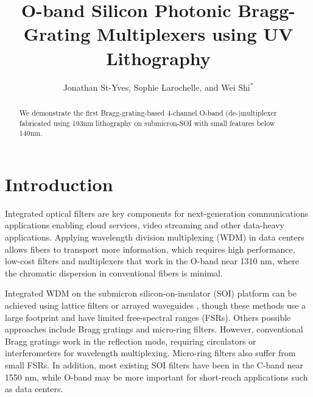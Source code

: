 \documentclass[letterpaper,10pt]{article}
\begin{document}
	
	\title{O-band Silicon Photonic Bragg-Grating Multiplexers using UV Lithography}
	
	\author{Jonathan St-Yves, Sophie Larochelle, and Wei Shi$^*$}
	\address{Centre d'optique, photonique et laser (COPL) and Département de génie électrique, Université Laval, 2375 rue de la Terrasse, Québec (Québec), Canada, G1V 0A6}
	
	\begin{abstract}
		We demonstrate the first Bragg-grating-based 4-channel O-band (de-)multiplexer fabricated using 193nm lithography on submicron-SOI with small features below 140nm.
	\end{abstract}
	
	
	\maketitle
	
	\section{Introduction}
	Integrated optical filters are key components for next-generation communications applications enabling cloud services, video streaming and other data-heavy applications. Applying wavelength division multiplexing (WDM) in data centers allows fibers to transport more information, which requires high performance, low-cost filters and multiplexers that work in the O-band near 1310 nm, where the chromatic dispersion in conventional fibers is minimal. 
	
	Integrated WDM on the submicron silicon-on-insulator (SOI) platform can be achieved using lattice filters\cite{horst2013cascaded} or arrayed waveguides \cite{okamoto2013fabrication}, though these methods use a large footprint and have limited free-spectral ranges (FSRs). Others possible approaches include Bragg gratings\cite{simard2012apodized} and micro-ring filters\cite{xu2006cascaded}. However, conventional Bragg gratings work in the reflection mode, requiring circulators or interferometers for wavelength multiplexing. Micro-ring filters also suffer from small FSRs. In addition, most existing SOI filters have been in the C-band near 1550 nm, while O-band may be more important for short-reach applications such as data centers.
	
\end{document}
